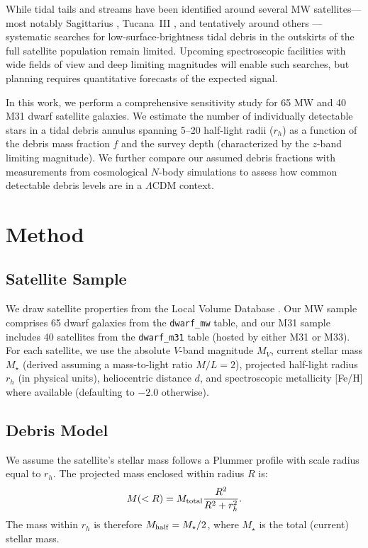 \documentclass[twocolumn]{aastex63}
\begin{document}
While tidal tails and streams have been identified around several MW satellites---most notably Sagittarius \citep{Ibata1994, Majewski2003}, Tucana~III \citep{Drlica-Wagner2015}, and tentatively around others \citep{Munoz2006, Sand2009}---systematic searches for low-surface-brightness tidal debris in the outskirts of the full satellite population remain limited. Upcoming spectroscopic facilities with wide fields of view and deep limiting magnitudes will enable such searches, but planning requires quantitative forecasts of the expected signal.

In this work, we perform a comprehensive sensitivity study for 65 MW and 40 M31 dwarf satellite galaxies. We estimate the number of individually detectable stars in a tidal debris annulus spanning 5--20 half-light radii ($r_h$) as a function of the debris mass fraction $f$ and the survey depth (characterized by the $z$-band limiting magnitude). We further compare our assumed debris fractions with measurements from cosmological $N$-body simulations to assess how common detectable debris levels are in a $\Lambda$CDM context.

\section{Method} \label{sec:method}

\subsection{Satellite Sample} \label{sec:sample}

We draw satellite properties from the Local Volume Database \citep[LVDB;][]{Pace2024}. Our MW sample comprises 65 dwarf galaxies from the \texttt{dwarf\_mw} table, and our M31 sample includes 40 satellites from the \texttt{dwarf\_m31} table (hosted by either M31 or M33). For each satellite, we use the absolute $V$-band magnitude $M_V$, current stellar mass $M_\star$ (derived assuming a mass-to-light ratio $M/L = 2$), projected half-light radius $r_h$ (in physical units), heliocentric distance $d$, and spectroscopic metallicity [Fe/H] where available (defaulting to $-2.0$ otherwise).

\subsection{Debris Model} \label{sec:debris}

We assume the satellite's stellar mass follows a Plummer profile with scale radius equal to $r_h$. The projected mass enclosed within radius $R$ is:
\begin{equation}
    M(<R) = M_{\rm total} \frac{R^2}{R^2 + r_h^2}.
\end{equation}
The mass within $r_h$ is therefore $M_{\rm half} = M_\star / 2$, where $M_\star$ is the total (current) stellar mass.
\end{document}

